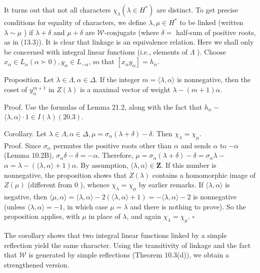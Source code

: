 \documentclass[10pt]{article}
\begin{document}
It turns out that not all characters $\chi_{\lambda}\left(\lambda \in H^{*}\right)$ are distinct. To get precise conditions for equality of characters, we define $\lambda, \mu \in H^{*}$ to be linked (written $\lambda \sim \mu$ ) if $\lambda+\delta$ and $\mu+\delta$ are $\mathscr{W}$-conjugate (where $\delta=$ half-sum of positive roots, as in (13.3)). It is clear that linkage is an equivalence relation. Here we shall only be concerned with integral linear functions (i.e., elements of $\Lambda$ ). Choose $x_{\alpha} \in L_{\alpha}(\alpha \succ 0), y_{\alpha} \in L_{-\alpha}$, so that $\left[x_{\alpha} y_{\alpha}\right]=h_{\alpha}$.

Proposition. Let $\lambda \in \Lambda, \alpha \in \Delta$. If the integer $m=\langle\lambda, \alpha\rangle$ is nonnegative, then the coset of $y_{\alpha}^{m+1}$ in $Z(\lambda)$ is a maximal vector of weight $\lambda-(m+1) \alpha$.

Proof. Use the formulas of Lemma 21.2, along with the fact that $h_{\alpha}-$ $\langle\lambda, \alpha\rangle \cdot 1 \in I(\lambda)(20.3)$.

Corollary. Let $\lambda \in \Lambda, \alpha \in \Delta, \mu=\sigma_{\alpha}(\lambda+\delta)-\delta$. Then $\chi_{\lambda}=\chi_{\mu}$.\\
Proof. Since $\sigma_{\alpha}$ permutes the positive roots other than $\alpha$ and sends $\alpha$ to $-\alpha$ (Lemma 10.2B), $\sigma_{\alpha} \delta-\delta=-\alpha$. Therefore, $\mu=\sigma_{\alpha}(\lambda+\delta)-\delta=\sigma_{\alpha} \lambda-$ $\alpha=\lambda-(\langle\lambda, \alpha\rangle+1) \alpha$. By assumption, $\langle\lambda, \alpha\rangle \in \mathbf{Z}$. If this number is nonnegative, the proposition shows that $Z(\lambda)$ contains a homomorphic image of $Z(\mu)$ (different from 0 ), whence $\chi_{\lambda}=\chi_{\mu}$ by earlier remarks. If $\langle\lambda, \alpha\rangle$ is\\
negative, then $\langle\mu, \alpha\rangle=\langle\lambda, \alpha\rangle-2(\langle\lambda, \alpha\rangle+1)=-\langle\lambda, \alpha\rangle-2$ is nonnegative (unless $\langle\lambda, \alpha\rangle=-1$, in which case $\mu=\lambda$ and there is nothing to prove). So the proposition applies, with $\mu$ in place of $\lambda$, and again $\chi_{\lambda}=\chi_{\mu}$. $\square$

The corollary shows that two integral linear functions linked by a simple reflection yield the same character. Using the transitivity of linkage and the fact that $\mathscr{W}$ is generated by simple reflections (Theorem 10.3(d)), we obtain a strengthened version.
\end{document}
